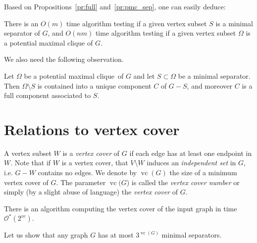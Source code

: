 \documentclass{llncs}
\newcommand{\cO}{\mathcal{O}}
\newcommand{\vc}{\operatorname{vc}}
\newcommand{\pmc}{potential maximal clique}
\begin{document}
 
Based on Propositions~\ref{pr:full} and~\ref{pr:pmc_sep}, one can easily deduce:
\begin{corollary}\label{co:pmc_rec}\label{co:sep_rec}
There is an $O(m)$ time algorithm testing if a given vertex subset $S$ is a minimal separator of $G$, and $O(nm)$ time algorithm testing if a given vertex subset $\Omega$ is a potential maximal clique of $G$. 
\end{corollary}

We also need the following observation.
\begin{proposition}\label{pr:pmc_comp}
Let $\Omega$ be a \pmc\ of $G$ and let $S \subset \Omega$ be a minimal separator. Then $\Omega \setminus S$ is contained into a unique component $C$ of $G - S$, and moreover 
$C$ is a full component associated to $S$.
\end{proposition}


\section{Relations to vertex cover}\label{se:vc}
A vertex subset $W$ is a \emph{vertex cover} of $G$ if each edge has at least one endpoint in $W$. Note that if $W$ is a vertex cover, that $V \setminus W$ induces an \emph{independent set} in $G$, i.e. $G - W$ contains no edges. We denote by $\vc(G)$ the size of a minimum vertex cover of $G$. The parameter $\vc(G$) is called the \emph{vertex cover number} or simply (by a slight abuse of language) the \emph{vertex cover} of $G$.

\begin{proposition}[folklore]\label{pr:vc_FPT}
There is an algorithm computing the vertex cover of the input graph in time $\cO^*(2^{vc})$.
\end{proposition}

Let us show that any graph $G$ has at most $3^{\vc(G)}$ minimal separators.
\end{document}
